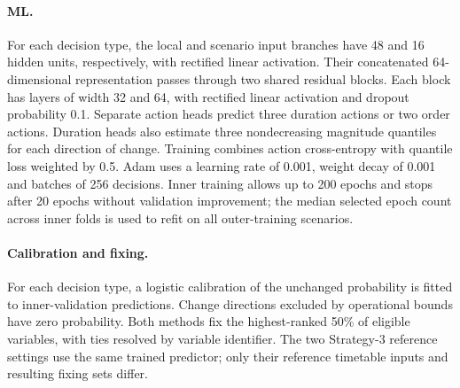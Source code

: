 \paragraph{ML.}
For each decision type, the local and scenario input branches have 48 and 16 hidden units, respectively, with rectified linear activation. Their concatenated 64-dimensional representation passes through two shared residual blocks. Each block has layers of width 32 and 64, with rectified linear activation and dropout probability 0.1. Separate action heads predict three duration actions or two order actions. Duration heads also estimate three nondecreasing magnitude quantiles for each direction of change. Training combines action cross-entropy with quantile loss weighted by 0.5. Adam uses a learning rate of 0.001, weight decay of 0.001 and batches of 256 decisions. Inner training allows up to 200 epochs and stops after 20 epochs without validation improvement; the median selected epoch count across inner folds is used to refit on all outer-training scenarios.

\paragraph{Calibration and fixing.}
For each decision type, a logistic calibration of the unchanged probability is fitted to inner-validation predictions. Change directions excluded by operational bounds have zero probability. Both methods fix the highest-ranked 50\% of eligible variables, with ties resolved by variable identifier. The two Strategy-3 reference settings use the same trained predictor; only their reference timetable inputs and resulting fixing sets differ.


